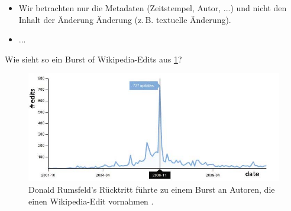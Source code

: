     \begin{itemize}
        \item Wir betrachten nur die Metadaten (Zeitstempel, Autor, ...) und nicht den Inhalt der Änderung Änderung (z.\,B. textuelle Änderung).
        \item ...
    \end{itemize}
    Wie sieht so ein Burst of Wikipedia-Edits aus \ref{fig:donald_rumsfelds_resignation_burst}?



\begin{figure}[h]
    \includegraphics[width=.5\textwidth]{images/Extracting_EventRelated_Information_from_Article.jpg}
    \caption{Donald Rumsfeld’s Rücktritt führte zu einem Burst an Autoren, die einen Wikipedia-Edit vornahmen \cite{10.1007978-3-642-36973-5_22}.}
    \label{fig:donald_rumsfelds_resignation_burst}
\end{figure}